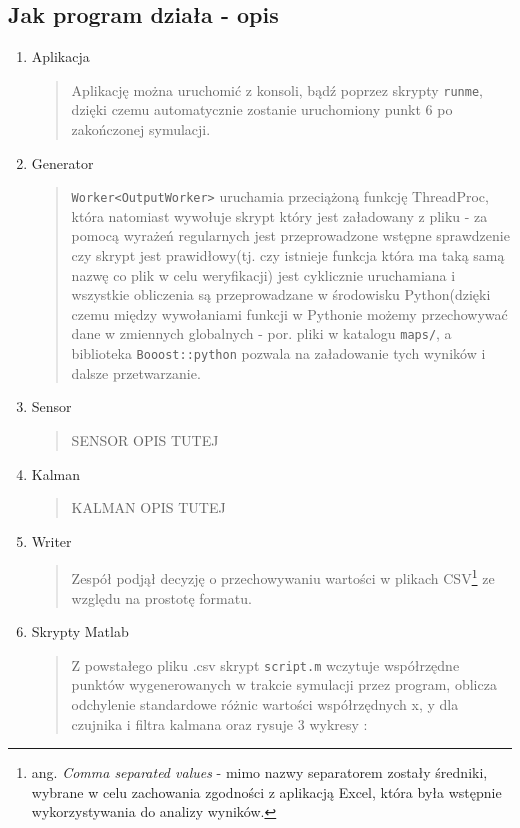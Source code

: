 \documentclass{article}
\begin{document}
	\subsection{Jak program działa - opis}
	\begin{enumerate}
		\item Aplikacja
		\begin{verse} 
			Aplikację można uruchomić z konsoli, bądź poprzez skrypty \texttt{runme}, dzięki czemu automatycznie zostanie uruchomiony punkt 6 po zakończonej symulacji.
		\end{verse}
		\item Generator
		 \begin{verse}
		 \texttt{Worker<OutputWorker>} uruchamia przeciążoną funkcję ThreadProc, która natomiast wywołuje skrypt który jest załadowany z pliku - za pomocą wyrażeń regularnych jest przeprowadzone wstępne sprawdzenie czy skrypt jest prawidłowy(tj. czy istnieje funkcja która ma taką samą nazwę co plik w celu weryfikacji) jest cyklicznie uruchamiana i wszystkie obliczenia są przeprowadzane w środowisku Python(dzięki czemu między wywołaniami funkcji w Pythonie możemy przechowywać dane w zmiennych globalnych - por. pliki w katalogu \texttt{maps/}, a biblioteka \texttt{Booost::python} pozwala na załadowanie tych wyników i dalsze przetwarzanie.
		 \end{verse}
		\item Sensor
		\begin{verse}
		SENSOR OPIS TUTEJ
		\end{verse}
		\item Kalman
		\begin{verse}
		KALMAN OPIS TUTEJ
		\end{verse}
		\item Writer
		\begin{verse}
		Zespół podjął decyzję o przechowywaniu wartości w plikach CSV\footnote{ang. \textit{Comma separated values} - mimo nazwy separatorem zostały średniki, wybrane w celu zachowania zgodności z aplikacją Excel, która była wstępnie wykorzystywania do analizy wyników.} ze względu na prostotę formatu. 
		\end{verse}
		\item Skrypty Matlab 
		\begin{verse}
		Z powstałego pliku .csv skrypt \texttt{script.m} wczytuje współrzędne
		punktów wygenerowanych w trakcie symulacji przez program,
		oblicza odchylenie standardowe różnic wartości współrzędnych
		x, y dla czujnika i filtra kalmana oraz rysuje 3 wykresy : 

\end{verse}
\end{enumerate}
\end{document}

